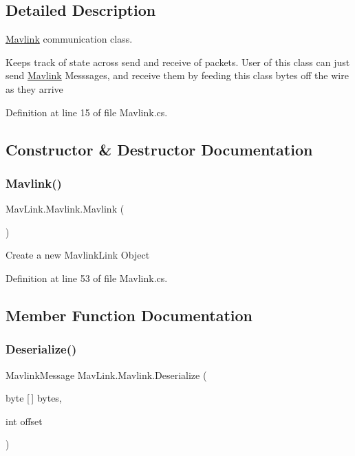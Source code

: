 \subsection{Detailed Description}
\mbox{\hyperlink{classMavLink_1_1Mavlink}{Mavlink}} communication class. 

Keeps track of state across send and receive of packets. User of this class can just send \mbox{\hyperlink{classMavLink_1_1Mavlink}{Mavlink}} Messsages, and receive them by feeding this class bytes off the wire as they arrive 

Definition at line 15 of file Mavlink.\+cs.



\subsection{Constructor \& Destructor Documentation}
\mbox{\label{classMavLink_1_1Mavlink_afe31f241e14b7a9df43494c3f777055f}} 
\subsubsection{\texorpdfstring{Mavlink()}{Mavlink()}}
{\footnotesize\ttfamily Mav\+Link.\+Mavlink.\+Mavlink (\begin{DoxyParamCaption}{ }\end{DoxyParamCaption})\hspace{0.3cm}{\ttfamily [inline]}}



Create a new Mavlink\+Link Object 



Definition at line 53 of file Mavlink.\+cs.



\subsection{Member Function Documentation}
\mbox{\label{classMavLink_1_1Mavlink_aeffd42986158db41e1e7151ae5d899f3}} 
\subsubsection{\texorpdfstring{Deserialize()}{Deserialize()}}
{\footnotesize\ttfamily Mavlink\+Message Mav\+Link.\+Mavlink.\+Deserialize (\begin{DoxyParamCaption}\item[{byte \mbox{[}$\,$\mbox{]}}]{bytes,  }\item[{int}]{offset }\end{DoxyParamCaption})\hspace{0.3cm}{\ttfamily [inline]}}



